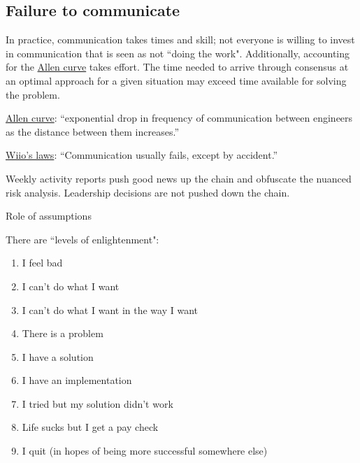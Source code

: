 \subsection{Failure to communicate}


In practice, communication takes times and skill; not everyone is willing to invest in communication that is seen as not ``doing the work". Additionally, accounting for the \href{https://en.wikipedia.org/wiki/Allen\_curve}{Allen curve} takes effort. The time needed to arrive through consensus at an optimal approach for a given situation may exceed time available for solving the problem.
 
 
\href{https://en.wikipedia.org/wiki/Allen_curve}{Allen curve}: ``exponential drop in frequency of communication between engineers as the distance between them increases.''

\href{https://en.wikipedia.org/wiki/Wiio\%27s_laws}{Wiio's laws}: ``Communication usually fails, except by accident.''


Weekly activity reports push good news up the chain and obfuscate the nuanced risk analysis. 
Leadership decisions are not pushed down the chain.

Role of assumptions 


There are ``levels of enlightenment":
\begin{enumerate}
    \item I feel bad
    \item I can't do what I want
    \item I can't do what I want in the way I want
    \item There is a problem
    \item I have a solution
    \item I have an implementation
    \item I tried but my solution didn't work
    \item Life sucks but I get a pay check
    \item I quit (in hopes of being more successful somewhere else)
\end{enumerate}
